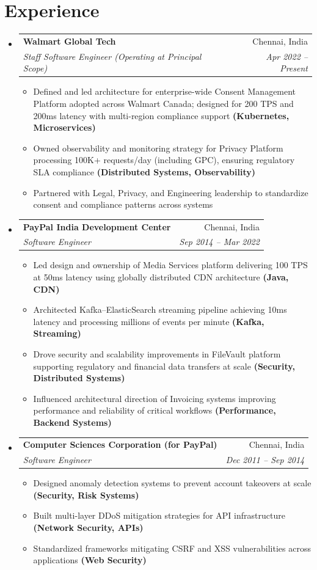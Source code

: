 \documentclass[letterpaper,11pt]{article}
\makeatletter
\newcommand{\resumeItem}[1]{\item \small{#1}}
\newcommand{\resumeSubheading}[4]{
  \vspace{-2pt}\item
  \begin{tabular*}{0.97\textwidth}{l@{\extracolsep{\fill}}r}
    \textbf{#1} & #2 \\
    \textit{\small#3} & \textit{\small #4} \\
  \end{tabular*}\vspace{-6pt}
}
\makeatother
\begin{document}
\section{Experience}
\begin{itemize}[leftmargin=*]

\resumeSubheading
{Walmart Global Tech}{Chennai, India}
{Staff Software Engineer (Operating at Principal Scope)}{Apr 2022 -- Present}

\begin{itemize}[leftmargin=*]
  \resumeItem{Defined and led architecture for enterprise-wide Consent Management Platform adopted across Walmart Canada; designed for 200 TPS and 200ms latency with multi-region compliance support \textbf{(Kubernetes, Microservices)}}
  \resumeItem{Owned observability and monitoring strategy for Privacy Platform processing 100K+ requests/day (including GPC), ensuring regulatory SLA compliance \textbf{(Distributed Systems, Observability)}}
  \resumeItem{Partnered with Legal, Privacy, and Engineering leadership to standardize consent and compliance patterns across systems}
\end{itemize}

\resumeSubheading
{PayPal India Development Center}{Chennai, India}
{Software Engineer}{Sep 2014 -- Mar 2022}

\begin{itemize}[leftmargin=*]
  \resumeItem{Led design and ownership of Media Services platform delivering 100 TPS at 50ms latency using globally distributed CDN architecture \textbf{(Java, CDN)}}
  \resumeItem{Architected Kafka–ElasticSearch streaming pipeline achieving 10ms latency and processing millions of events per minute \textbf{(Kafka, Streaming)}}
  \resumeItem{Drove security and scalability improvements in FileVault platform supporting regulatory and financial data transfers at scale \textbf{(Security, Distributed Systems)}}
  \resumeItem{Influenced architectural direction of Invoicing systems improving performance and reliability of critical workflows \textbf{(Performance, Backend Systems)}}
\end{itemize}

\resumeSubheading
{Computer Sciences Corporation (for PayPal)}{Chennai, India}
{Software Engineer}{Dec 2011 -- Sep 2014}

\begin{itemize}[leftmargin=*]
  \resumeItem{Designed anomaly detection systems to prevent account takeovers at scale \textbf{(Security, Risk Systems)}}
  \resumeItem{Built multi-layer DDoS mitigation strategies for API infrastructure \textbf{(Network Security, APIs)}}
  \resumeItem{Standardized frameworks mitigating CSRF and XSS vulnerabilities across applications \textbf{(Web Security)}}
\end{itemize}


\end{itemize}
\end{document}
